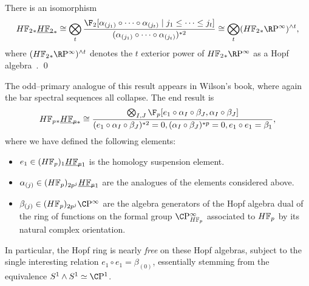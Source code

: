 \begin{corollary}\label{CalculationOfUnstableSteenrodHopfRing}
There is an isomorphism
\[\HFtwo_* \OS{\HFtwo}{*} \cong \bigotimes_t \frac{\F_2[\alpha_{(j_1)} \circ \cdots \circ \alpha_{(j_t)} \mid j_1 \le \cdots \le j_t]}{(\alpha_{(j_1)} \circ \cdots \circ \alpha_{(j_t)})^{\ast 2}} \cong \bigotimes_t (\HFtwo_* \RP^\infty)^{\sm t},\] where \((\HFtwo_* \RP^\infty)^{\sm t}\) denotes the \(t\){\th} exterior power of \(\HFtwo_* \RP^\infty\) as a Hopf algebra~\cite[Propposition 5.5]{GoerssDieudonne}. \qed
\end{corollary}

\begin{remark}
The odd--primary analogue of this result appears in Wilson's book, where again the bar spectral sequences all collapse.  The end result is \[\HFp_* \OS{\HFp}{*} \cong \frac{\bigotimes_{I, J} \F_p[e_1 \circ \alpha_I \circ \beta_J, \alpha_I \circ \beta_J]}{(e_1 \circ \alpha_I \circ \beta_J)^{\ast 2} = 0, (\alpha_I \circ \beta_J)^{\ast p} = 0, e_1 \circ e_1 = \beta_1},\] where we have defined the following elements:
\begin{itemize}
\item \(e_1 \in (\HFp)_1 \OS{\HFp}{1}\) is the homology suspension element.
\item \(\alpha_{(j)} \in (\HFp)_{2p^j} \OS{\HFp}{1}\) are the analogues of the elements considered above.
\item \(\beta_{(j)} \in (\HFp)_{2p^j} \CP^\infty\) are the algebra generators of the Hopf algebra dual of the ring of functions on the formal group \(\CP^\infty_{\HFp}\) associated to \(\HFp\) by its natural complex orientation.
\end{itemize}
In particular, the Hopf ring is nearly \emph{free} on these Hopf algebras, subject to the single interesting relation \(e_1 \circ e_1 = \beta_{(0)}\), essentially stemming from the equivalence \(S^1 \sm S^1 \simeq \CP^1\).
\end{remark}

